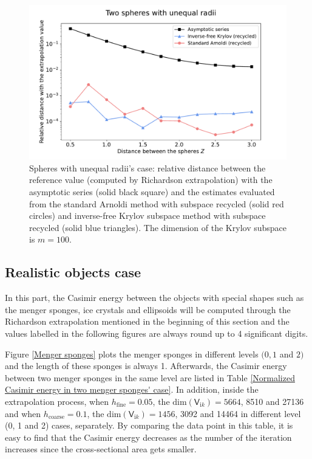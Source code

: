 \begin{figure}[H]
    \centering
    \includegraphics[scale = 0.5]{figures/relative_distance_unequal_radii.pdf}
    \caption{Spheres with unequal radii's case: relative distance between the reference value (computed by Richardson extrapolation) with the asymptotic series (solid black square)  
    and the estimates evaluated from the standard Arnoldi method with subspace recycled (solid red circles) and inverse-free Krylov subspace method 
    with subspace recycled (solid blue triangles). The dimension of the Krylov subspace is $m = 100$.}
    \label{unequal_radii_rel_dist}
\end{figure}

\subsection{Realistic objects case}
In this part, the Casimir energy between the objects with special shapes such as the menger sponges, ice crystals and ellipsoids will be computed 
through the Richardson extrapolation mentioned in the beginning of this section and the values labelled in the following figures are always round up to 4 significant digits. 

Figure \ref{Menger sponges} plots the menger sponges in different levels $(0, 1 $ and $ 2)$ and the length of these sponges is always 1. Afterwards, the Casimir 
energy between two menger sponges in the same level are listed in Table \ref{Normalized Casimir energy in two menger sponges' case}. 
In addition, inside the extrapolation process, when $h_{\text{fine}} = 0.05$, the $\text{dim}(\mathsf{V}_{\mathrm{i}k}) = 5664$, 8510 and 27136 and 
when $h_{\text{coarse}} = 0.1$, the $\text{dim}(\mathsf{V}_{\mathrm{i}k}) = 1456$, 3092 and 14464 in different level (0, 1 and 2) cases, separately. 
By comparing the data 
point in this table, it is easy to find that the Casimir energy decreases as the number of the iteration increases since the cross-sectional 
area gets smaller.

